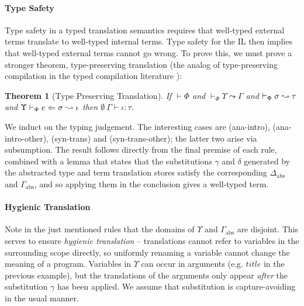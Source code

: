 \documentclass[10pt,preprint]{sigplanconf}
\newtheorem{theorem}{Theorem}
\newenvironment{proof-sketch}{\noindent{\emph{Proof Sketch.}}}{\qed}
\begin{document}
\paragraph{Type Safety}
Type safety in a typed translation semantics requires that well-typed external terms translate to well-typed internal terms. Type safety for the IL \cite{pfpl} then implies that well-typed external terms cannot go wrong. To prove this, we must prove a stronger theorem, type-preserving translation (the analog of type-preserving compilation in the typed compilation literature \cite{tarditi+:til-OLD}):%

\begin{theorem}[Type Preserving Translation]
If $\vdash \Phi$ and $\vdash_\Phi \Upsilon \leadsto \Gamma$ and $\vdash_\Phi \sigma \leadsto \tau$ and $\Upsilon \vdash_{\Phi} e \Leftarrow \sigma \leadsto \iota$ then $\emptyset~\Gamma \vdash \iota : \tau$.
\end{theorem}
\begin{proof-sketch}
We induct on the typing judgement. The interesting cases are (ana-intro), (ana-intro-other), (syn-trans) and (syn-trans-other); the latter two arise via subsumption. The result follows directly from the final premise of each rule, combined with a lemma that states that the substitutions $\gamma$ and $\delta$ generated by the abstracted type and term translation stores satisfy the corresponding $\Delta_\text{abs}$ and $\Gamma_\text{abs}$, and so applying them in the conclusion gives a well-typed term.
\end{proof-sketch}

\paragraph{Hygienic Translation} 
Note in the just mentioned rules that the domains of $\Upsilon$ and $\Gamma_\text{abs}$ are disjoint. This serves to ensure \emph{hygienic translation} -- translations cannot refer to variables in the surrounding scope directly, so uniformly renaming a variable cannot change the meaning of a program. Variables in $\Upsilon$ can  occur in arguments (e.g. $title$ in the previous example), but the translations of the arguments only appear \emph{after} the substitution $\gamma$ has been applied. We assume that substitution is capture-avoiding in the usual manner. %
\end{document}
